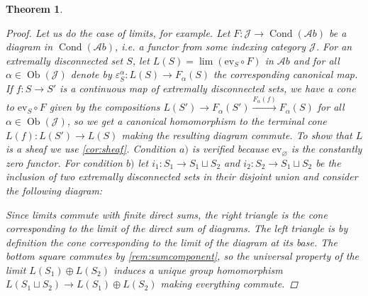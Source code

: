 \documentclass[11pt,A4]{article}
\theoremstyle{plain}
\newtheorem{thm}{Theorem}[section]
\theoremstyle{definition}
\theoremstyle{remark}
\newcommand{\1}{\mathbbm{1}}
\newcommand{\Ab}{\mathscr{A}b}
\DeclareMathOperator{\Cond}{Cond}
\DeclareMathOperator{\Ob}{Ob}
\newcommand{\op}{\oplus}
\newcommand{\ev}{\mathrm{ev}}
\begin{document}
\begin{thm}
\begin{proof}
	Let us do the case of limits, for example.
	Let $F\colon \mathscr{J}\to \Cond(\Ab)$ be a diagram in $\Cond(\Ab)$, i.e. a functor from some indexing category $\mathscr{J}$.
	For an extremally disconnected set $S$, let $L(S)=\lim(\ev_{S}\circ F)$ in $\Ab$ and for all $\alpha \in \Ob(\mathscr{J})$ denote by $\varepsilon^{\alpha}_{S}\colon L(S)\to F_{\alpha}(S)$ the corresponding canonical map.
	If $f\colon S\to S'$ is a continuous map of extremally disconnected sets, we have a cone to $\ev_{S}\circ F$ given by the compositions $L(S')\to F_{\alpha}(S')\xrightarrow{F_{\alpha}(f)} F_{\alpha}(S)$ for all $\alpha\in\Ob(\mathscr{J})$, so we get a canonical homomorphism to the terminal cone $L(f)\colon L(S')\to L(S)$ making the resulting diagram commute.
	To show that $L$ is a sheaf we use \cref{cor:sheaf}.
	Condition $a)$ is verified because $\ev_{\varnothing}$ is the constantly zero functor.
	For condition $b)$ let $i_{1}\colon S_{1}\to S_{1}\sqcup S_{2}$ and $i_{2}\colon S_{2}\to S_{1}\sqcup S_{2}$ be the inclusion of two extremally disconnected sets in their disjoint union and consider the following diagram:
	\begin{center}
	\end{center}
	Since limits commute with finite direct sums, the right triangle is the cone corresponding to the limit of the direct sum of diagrams.
	The left triangle is by definition the cone corresponding to the limit of the diagram at its base.
	The bottom square commutes by \cref{rem:sumcomponent}, so the universal property of the limit $L(S_{1})\op L(S_{2})$ induces a unique group homomorphism $L(S_{1}\sqcup S_{2})\to L(S_{1})\op L(S_{2})$ making everything commute.

\end{proof}
\end{thm}
\end{document}
